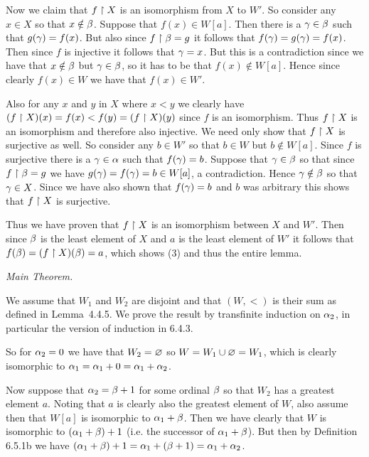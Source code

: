 \begin{questions}
\begin{solution}
{        Now we claim that $f \restriction X$ is an isomorphism from $X$ to $W'$.
        So consider any $x \in X$ so that $x \notin \beta$.
        Suppose that $f(x) \in W[a]$.
        Then there is a $\gamma \in \beta$ such that $g(\gamma) = f(x)$.
        But also since $f \restriction \beta = g$ it follows that $f(\gamma) = g(\gamma) = f(x)$.
        Then since $f$ is injective it follows that $\gamma = x$.
        But this is a contradiction since we have that $x \notin \beta$ but $\gamma \in \beta$, so it has to be that $f(x) \notin W[a]$.
        Hence since clearly $f(x) \in W$ we have that $f(x) \in W'$.

        Also for any $x$ and $y$ in $X$ where $x < y$ we clearly have $(f \restriction X)(x) = f(x) < f(y) = (f \restriction X)(y)$ since $f$ is an isomorphism.
        Thus $f \restriction X$ is an isomorphism and therefore also injective.
        We need only show that $f \restriction X$ is surjective as well.
        So consider any $b \in W'$ so that $b \in W$ but $b \notin W[a]$.
        Since $f$ is surjective there is a $\gamma \in \alpha$ such that $f(\gamma) = b$.
        Suppose that $\gamma \in \beta$ so that since $f \restriction \beta = g$ we have $g(\gamma) = f(\gamma) = b \in W[a]$, a contradiction.
        Hence $\gamma \notin \beta$ so that $\gamma \in X$.
        Since we have also shown that $f(\gamma) = b$ and $b$ was arbitrary this shows that $f \restriction X$ is surjective.

        Thus we have proven that $f \restriction X$ is an isomorphism between $X$ and $W'$.
        Then since $\beta$ is the least element of $X$ and $a$ is the least element of $W'$ it follows that $f(\beta) = (f \restriction X)(\beta) = a$, which shows (3) and thus the entire lemma. \qedsymbol
    }

    \emph{Main Theorem.}
    
    We assume that $W_1$ and $W_2$ are disjoint and that $(W,<)$ is their sum as defined in Lemma~4.4.5.
    We prove the result by transfinite induction on $\alpha_2$, in particular the version of induction in 6.4.3.

    So for $\alpha_2 = 0$ we have that $W_2 = \varnothing$ so $W = W_1 \cup \varnothing = W_1$, which is clearly isomorphic to $\alpha_1 = \alpha_1 + 0 = \alpha_1 + \alpha_2$.

    Now suppose that $\alpha_2 = \beta+1$ for some ordinal $\beta$ so that $W_2$ has a greatest element $a$.
    Noting that $a$ is clearly also the greatest element of $W$, also assume then that $W[a]$ is isomorphic to $\alpha_1 + \beta$.
    Then we have clearly that $W$ is isomorphic to $(\alpha_1 + \beta) + 1$ (i.e. the successor of $\alpha_1 + \beta$).
    But then by Definition 6.5.1b we have $(\alpha_1 + \beta) + 1 = \alpha_1 + (\beta+ 1) = \alpha_1 + \alpha_2$.


\end{solution}
\end{questions}
